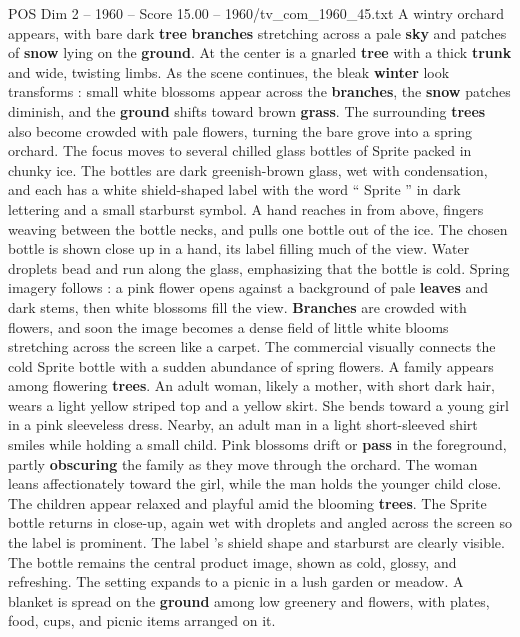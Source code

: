 \begin{textsample}{POS Dim 2 – 1960 – Score 15.00 – 1960/tv\_com\_1960\_45.txt}  \label{ex:f2_pos_017}
A wintry orchard appears, with bare dark \textbf{tree} \textbf{branches} stretching across a pale \textbf{sky} and patches of \textbf{snow} lying on the \textbf{ground}.
At the center is a gnarled \textbf{tree} with a thick \textbf{trunk} and wide, twisting limbs.
As the scene continues, the bleak \textbf{winter} look transforms : small white blossoms appear across the \textbf{branches}, the \textbf{snow} patches diminish, and the \textbf{ground} shifts toward brown \textbf{grass}.
The surrounding \textbf{trees} also become crowded with pale flowers, turning the bare grove into a spring orchard.
The focus moves to several chilled glass bottles of Sprite packed in chunky ice.
The bottles are dark greenish-brown glass, wet with condensation, and each has a white shield-shaped label with the word “ Sprite ” in dark lettering and a small starburst symbol.
A hand reaches in from above, fingers weaving between the bottle necks, and pulls one bottle out of the ice.
The chosen bottle is shown close up in a hand, its label filling much of the view.
Water droplets bead and run along the glass, emphasizing that the bottle is cold.
Spring imagery follows : a pink flower opens against a background of pale \textbf{leaves} and dark stems, then white blossoms fill the view. \textbf{Branches} are crowded with flowers, and soon the image becomes a dense field of little white blooms stretching across the screen like a carpet.
The commercial visually connects the cold Sprite bottle with a sudden abundance of spring flowers.
A family appears among flowering \textbf{trees}.
An adult woman, likely a mother, with short dark hair, wears a light yellow striped top and a yellow skirt.
She bends toward a young girl in a pink sleeveless dress.
Nearby, an adult man in a light short-sleeved shirt smiles while holding a small child.
Pink blossoms drift or \textbf{pass} in the foreground, partly \textbf{obscuring} the family as they move through the orchard.
The woman leans affectionately toward the girl, while the man holds the younger child close.
The children appear relaxed and playful amid the blooming \textbf{trees}.
The Sprite bottle returns in close-up, again wet with droplets and angled across the screen so the label is prominent.
The label ’s shield shape and starburst are clearly visible.
The bottle remains the central product image, shown as cold, glossy, and refreshing.
The setting expands to a picnic in a lush garden or meadow.
A blanket is spread on the \textbf{ground} among low greenery and flowers, with plates, food, cups, and picnic items arranged on it.

\end{textsample}

